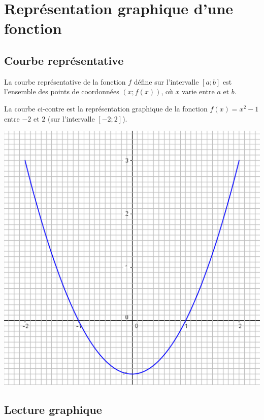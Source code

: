 \documentclass[12pt,a4paper]{article}
\begin{document}
\section{Représentation graphique d'une fonction}

\subsection{Courbe représentative}

\begin{mydef}
	La courbe représentative de la fonction $f$ défine sur l'intervalle $[a;b]$ est l'ensemble des points de coordonnées $(x;f(x))$, où $x$ varie entre $a$ et $b$.
\end{mydef}

\begin{myex}
	\begin{multicols}{2}
		La courbe ci-contre est la représentation graphique de la fonction $f(x)=x^2-1$ entre $-2$ et $2$ (sur l'intervalle $[-2;2]$).
		
		\includegraphics[scale=0.4]{img/ex1}
	\end{multicols}
	
\end{myex}
	
\subsection{Lecture graphique}
\end{document}

